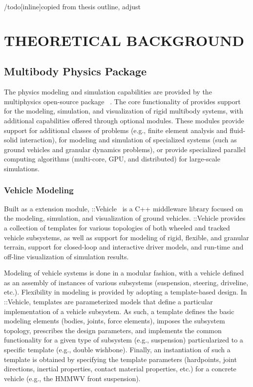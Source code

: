 \documentclass[12pt,onecolumn]{article}
\newcommand{\CHRONO}{{\sffamily{{Chrono}}}}
\newcommand{\ChronoVehicle}{{\sffamily{Chrono}}::Vehicle}
\begin{document}
/todo[inline]{copied from thesis outline, adjust}


\section{THEORETICAL BACKGROUND}\label{s:background}

\subsection{{\CHRONO} Multibody Physics Package}\label{ss:Chrono}

The physics modeling and simulation capabilities are provided by the multiphysics open-source package {\CHRONO}~\cite{Chrono2016}. The core functionality of {\CHRONO} provides support for the modeling, simulation, and visualization of rigid multibody systems, with additional capabilities offered through optional modules. These modules provide support for additional classes of problems (e.g., finite element analysis and fluid-solid interaction), for modeling and simulation of specialized systems (such as ground vehicles and granular dynamics problems), or provide specialized parallel computing algorithms (multi-core, GPU, and distributed) for large-scale simulations.


\subsubsection{Vehicle Modeling}\label{sss:Chrono_Vehicle}
	
Built as a {\CHRONO} extension module, {\ChronoVehicle}~\cite{ChronoVehicle_paper} is a C++ middleware library focused on the modeling, simulation, and visualization of ground vehicles.
%
{\ChronoVehicle} provides a collection of templates for various topologies of both wheeled and tracked vehicle subsystems, as well as support for modeling of rigid, flexible, and granular terrain, support for closed-loop and interactive driver models, and run-time and off-line visualization of simulation results.

Modeling of vehicle systems is done in a modular fashion, with a vehicle defined as an assembly of instances of various subsystems (suspension, steering, driveline, etc.).  Flexibility in modeling is provided by adopting a template-based design. In {\ChronoVehicle}, templates are parameterized models that define a particular implementation of a vehicle subsystem. As such, a template defines the basic modeling elements (bodies, joints, force elements), imposes the subsystem topology, prescribes the design parameters, and implements the common functionality for a given type of subsystem (e.g., suspension) particularized to a specific template (e.g., double wishbone). Finally, an instantiation of such a template is obtained by specifying the template parameters (hardpoints, joint directions, inertial properties, contact material properties, etc.) for a concrete vehicle (e.g., the HMMWV front suspension).
\end{document}
